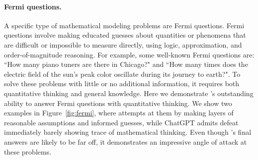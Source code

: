 \paragraph{Fermi questions.} A specific type of mathematical modeling problems are Fermi questions. Fermi questions involve making educated guesses about quantities or phenomena that are difficult or impossible to measure directly, using logic, approximation, and order-of-magnitude reasoning. For example, some well-known Fermi questions are: ``How many piano tuners are there in Chicago?" and ``How many times does the electric field of the sun’s peak color oscillate during its journey to earth?". To solve these problems with little or no additional information, it requires both quantitative thinking and general knowledge. Here we demonstrate \DV's outstanding ability to answer Fermi questions with quantitative thinking. We show two examples in Figure~\ref{fig:fermi}, where \DV attempts at them by making layers of reasonable assumptions and informed guesses, while ChatGPT admits defeat immediately barely showing trace of mathematical thinking. Even though \DV's final answers are likely to be far off, it demonstrates an impressive angle of attack at these problems.

